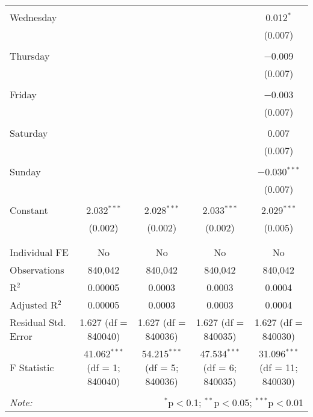 \documentclass[
]{article}
\begin{document}
\begin{table}[!htbp]
{\begin{tabular}{@{\extracolsep{5pt}}lcccc}
  & & & & \\ 
 Wednesday &  &  &  & 0.012$^{*}$ \\ 
  &  &  &  & (0.007) \\ 
  & & & & \\ 
 Thursday &  &  &  & $-$0.009 \\ 
  &  &  &  & (0.007) \\ 
  & & & & \\ 
 Friday &  &  &  & $-$0.003 \\ 
  &  &  &  & (0.007) \\ 
  & & & & \\ 
 Saturday &  &  &  & 0.007 \\ 
  &  &  &  & (0.007) \\ 
  & & & & \\ 
 Sunday &  &  &  & $-$0.030$^{***}$ \\ 
  &  &  &  & (0.007) \\ 
  & & & & \\ 
 Constant & 2.032$^{***}$ & 2.028$^{***}$ & 2.033$^{***}$ & 2.029$^{***}$ \\ 
  & (0.002) & (0.002) & (0.002) & (0.005) \\ 
  & & & & \\ 
\hline \\[-1.8ex] 
Individual FE & No & No & No & No \\ 
Observations & 840,042 & 840,042 & 840,042 & 840,042 \\ 
R$^{2}$ & 0.00005 & 0.0003 & 0.0003 & 0.0004 \\ 
Adjusted R$^{2}$ & 0.00005 & 0.0003 & 0.0003 & 0.0004 \\ 
Residual Std. Error & 1.627 (df = 840040) & 1.627 (df = 840036) & 1.627 (df = 840035) & 1.627 (df = 840030) \\ 
F Statistic & 41.062$^{***}$ (df = 1; 840040) & 54.215$^{***}$ (df = 5; 840036) & 47.534$^{***}$ (df = 6; 840035) & 31.096$^{***}$ (df = 11; 840030) \\ 
\hline 
\hline \\[-1.8ex] 
\textit{Note:}  & \multicolumn{4}{r}{$^{*}$p$<$0.1; $^{**}$p$<$0.05; $^{***}$p$<$0.01} \\ 
\end{tabular}
} 
\end{table} 
\newpage
\end{document}
